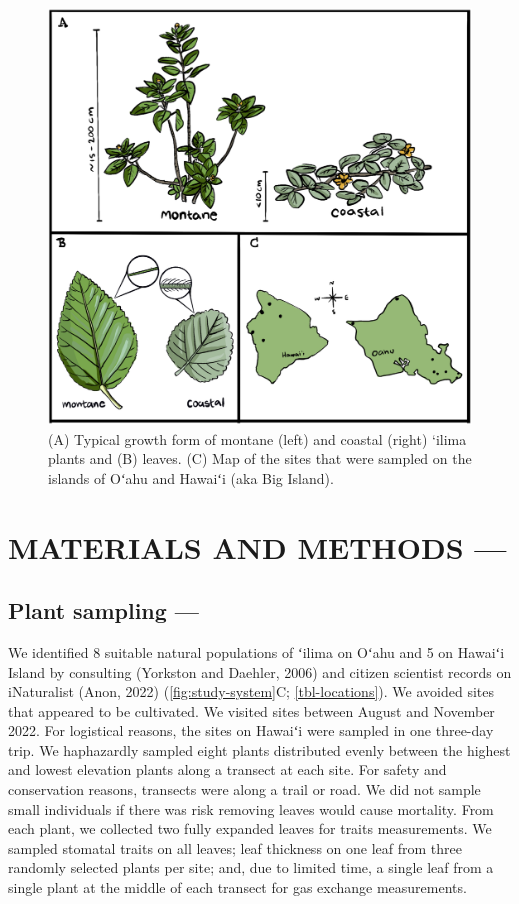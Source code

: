 \documentclass[
  letterpaper,
  DIV=11,
  numbers=noendperiod]{scrartcl}
\begin{document}
\begin{figure}[H]
  \includegraphics{../figures/study-system.pdf}
  \caption{(A) Typical growth form of montane (left) and coastal (right) ‘ilima plants and (B) leaves. (C) Map of the sites that were sampled on the islands of Oʻahu and Hawaiʻi (aka Big Island).}
  \label{fig:study-system}
\end{figure}

\hypertarget{methods}{%
\section{MATERIALS AND METHODS ---}\label{methods}}

\hypertarget{plant-sampling}{%
\subsection{Plant sampling ---}\label{plant-sampling}}

We identified 8 suitable natural populations of ʻilima on Oʻahu and 5 on
Hawaiʻi Island by consulting (Yorkston and Daehler, 2006) and citizen
scientist records on iNaturalist (Anon, 2022)
(\autoref{fig:study-system}C; \autoref{tbl-locations}). We avoided sites
that appeared to be cultivated. We visited sites between August and
November 2022. For logistical reasons, the sites on Hawaiʻi were sampled
in one three-day trip. We haphazardly sampled eight plants distributed
evenly between the highest and lowest elevation plants along a transect
at each site. For safety and conservation reasons, transects were along
a trail or road. We did not sample small individuals if there was risk
removing leaves would cause mortality. From each plant, we collected two
fully expanded leaves for traits measurements. We sampled stomatal
traits on all leaves; leaf thickness on one leaf from three randomly
selected plants per site; and, due to limited time, a single leaf from a
single plant at the middle of each transect for gas exchange
measurements.
\end{document}
